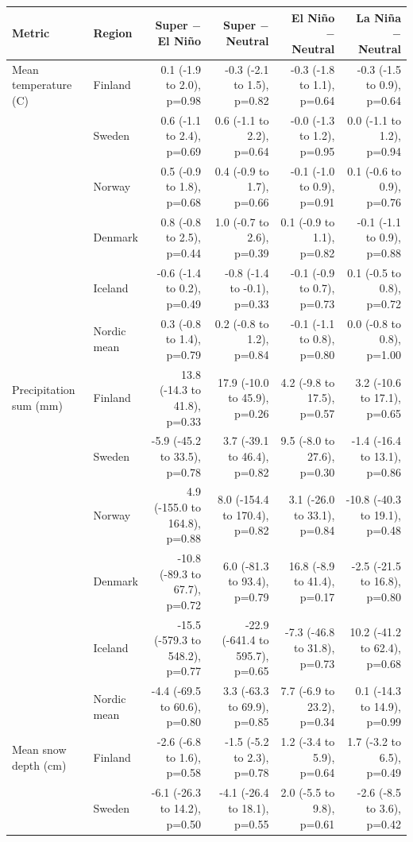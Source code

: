 \begin{tabular}{llrrrr}
\toprule
Metric & Region & Super $-$ El Niño & Super $-$ Neutral & El Niño $-$ Neutral & La Niña $-$ Neutral \\
\midrule
Mean temperature (\textdegree{}C) & Finland & 0.1 (-1.9 to 2.0), p=0.98 & -0.3 (-2.1 to 1.5), p=0.82 & -0.3 (-1.8 to 1.1), p=0.64 & -0.3 (-1.5 to 0.9), p=0.64 \\
 & Sweden & 0.6 (-1.1 to 2.4), p=0.69 & 0.6 (-1.1 to 2.2), p=0.64 & -0.0 (-1.3 to 1.2), p=0.95 & 0.0 (-1.1 to 1.2), p=0.94 \\
 & Norway & 0.5 (-0.9 to 1.8), p=0.68 & 0.4 (-0.9 to 1.7), p=0.66 & -0.1 (-1.0 to 0.9), p=0.91 & 0.1 (-0.6 to 0.9), p=0.76 \\
 & Denmark & 0.8 (-0.8 to 2.5), p=0.44 & 1.0 (-0.7 to 2.6), p=0.39 & 0.1 (-0.9 to 1.1), p=0.82 & -0.1 (-1.1 to 0.9), p=0.88 \\
 & Iceland & -0.6 (-1.4 to 0.2), p=0.49 & -0.8 (-1.4 to -0.1), p=0.33 & -0.1 (-0.9 to 0.7), p=0.73 & 0.1 (-0.5 to 0.8), p=0.72 \\
 & Nordic mean & 0.3 (-0.8 to 1.4), p=0.79 & 0.2 (-0.8 to 1.2), p=0.84 & -0.1 (-1.1 to 0.8), p=0.80 & 0.0 (-0.8 to 0.8), p=1.00 \\
\addlinespace
Precipitation sum (mm) & Finland & 13.8 (-14.3 to 41.8), p=0.33 & 17.9 (-10.0 to 45.9), p=0.26 & 4.2 (-9.8 to 17.5), p=0.57 & 3.2 (-10.6 to 17.1), p=0.65 \\
 & Sweden & -5.9 (-45.2 to 33.5), p=0.78 & 3.7 (-39.1 to 46.4), p=0.82 & 9.5 (-8.0 to 27.6), p=0.30 & -1.4 (-16.4 to 13.1), p=0.86 \\
 & Norway & 4.9 (-155.0 to 164.8), p=0.88 & 8.0 (-154.4 to 170.4), p=0.82 & 3.1 (-26.0 to 33.1), p=0.84 & -10.8 (-40.3 to 19.1), p=0.48 \\
 & Denmark & -10.8 (-89.3 to 67.7), p=0.72 & 6.0 (-81.3 to 93.4), p=0.79 & 16.8 (-8.9 to 41.4), p=0.17 & -2.5 (-21.5 to 16.8), p=0.80 \\
 & Iceland & -15.5 (-579.3 to 548.2), p=0.77 & -22.9 (-641.4 to 595.7), p=0.65 & -7.3 (-46.8 to 31.8), p=0.73 & 10.2 (-41.2 to 62.4), p=0.68 \\
 & Nordic mean & -4.4 (-69.5 to 60.6), p=0.80 & 3.3 (-63.3 to 69.9), p=0.85 & 7.7 (-6.9 to 23.2), p=0.34 & 0.1 (-14.3 to 14.9), p=0.99 \\
\addlinespace
Mean snow depth (cm) & Finland & -2.6 (-6.8 to 1.6), p=0.58 & -1.5 (-5.2 to 2.3), p=0.78 & 1.2 (-3.4 to 5.9), p=0.64 & 1.7 (-3.2 to 6.5), p=0.49 \\
 & Sweden & -6.1 (-26.3 to 14.2), p=0.50 & -4.1 (-26.4 to 18.1), p=0.55 & 2.0 (-5.5 to 9.8), p=0.61 & -2.6 (-8.5 to 3.6), p=0.42 \\

\end{tabular}
